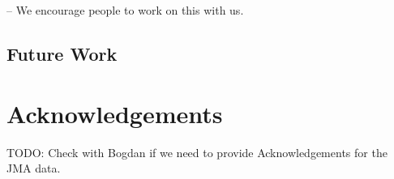 \documentclass{sig-alternate}
\begin{document}
-- We encourage people to work on this with us.

\subsection{Future Work}




\section*{Acknowledgements}

TODO: Check with Bogdan if we need to provide Acknowledgements for the
JMA data.




\end{document}
